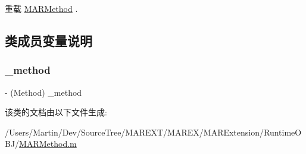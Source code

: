 重载 \hyperlink{interface_m_a_r_method_a95142a29169eb3b6d4b3c5e8d0db54a5}{M\+A\+R\+Method} .



\subsection{类成员变量说明}
\mbox{\label{interface_m_a_r_obj_c_method_aa1094dc567c58d50656b418cbd5c71d6}} 
\subsubsection{\texorpdfstring{\+\_\+method}{\_method}}
{\footnotesize\ttfamily -\/ (Method) \+\_\+method\hspace{0.3cm}{\ttfamily [protected]}}



该类的文档由以下文件生成\+:\begin{DoxyCompactItemize}
\item 
/\+Users/\+Martin/\+Dev/\+Source\+Tree/\+M\+A\+R\+E\+X\+T/\+M\+A\+R\+E\+X/\+M\+A\+R\+Extension/\+Runtime\+O\+B\+J/\hyperlink{_m_a_r_method_8m}{M\+A\+R\+Method.\+m}\end{DoxyCompactItemize}

